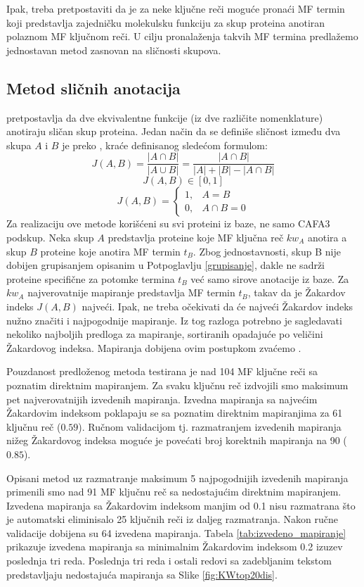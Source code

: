 Ipak, treba pretpostaviti da je za neke ključne reči moguće pronaći MF termin
koji predstavlja zajedničku molekulsku funkciju za skup proteina anotiran
polaznom MF ključnom reči.  U cilju pronalaženja takvih MF termina predlažemo
jednostavan metod zasnovan na sličnosti skupova.

\subsection{Metod sličnih anotacija}

 pretpostavlja da dve ekvivalentne funkcije (iz dve
različite nomenklature) anotiraju sličan skup proteina.  Jedan način da se
definiše sličnost između dva skupa $A$ i $B$ je preko 
, kraće   definisanog sledećom formulom:
$$J(A,B) = \dfrac{|A \cap B|}{|A \cup B|} =  \dfrac{|A \cap B|}{|A|+|B|-|A \cap B|}$$
$$  J(A,B) \in [0, 1] $$
\[   
  J(A,B) = 
    \begin{cases}
      1,&A=B  \\
      0,&A\cap B=0
    \end{cases}
\]
Za realizaciju ove metode korišćeni su svi proteini iz \swissprot baze, ne samo
CAFA3 podskup.  Neka skup $A$ predstavlja proteine koje MF ključna reč $kw_A$
anotira a skup $B$ proteine koje anotira MF termin $t_B$.  Zbog jednostavnosti,
skup B nije dobijen grupisanjem opisanim u Potpoglavlju \ref{grupisanje}, dakle ne sadrži proteine specifične za potomke termina $t_B$ već samo
sirove anotacije iz \swissprot baze.  Za $kw_A$ najverovatnije
mapiranje predstavlja MF termin $t_B$, takav da je Žakardov indeks $J(A,B)$
najveći. Ipak, ne treba očekivati da će najveći Žakardov indeks nužno značiti i
najpogodnije mapiranje. Iz tog razloga potrebno je  sagledavati nekoliko
najboljih predloga za mapiranje, sortiranih opadajuće po veličini Žakardovog
indeksa. Mapiranja dobijena ovim postupkom zvaćemo .

Pouzdanost predloženog metoda testirana je nad 104 MF ključne reči sa poznatim
direktnim mapiranjem.  Za svaku ključnu reč izdvojili smo maksimum pet
najverovatnijih izvedenih mapiranja. Izvedna mapiranja sa najvećim Žakardovim
indeksom poklapaju se sa poznatim direktnim mapiranjima za 61 ključnu reč
($0.59$). Ručnom validacijom tj. razmatranjem izvedenih mapiranja nižeg
Žakardovog indeksa moguće je povećati broj korektnih mapiranja na 90
($0.85$).

Opisani metod uz razmatranje maksimum 5 najpogodnijih izvedenih mapiranja
primenili smo nad 91 MF ključnu reč sa nedostajućim direktnim mapiranjem.
Izvedena mapiranja sa Žakardovim indeksom manjim od 0.1 nisu razmatrana što je
automatski eliminisalo 25 ključnih reči iz daljeg razmatranja. Nakon ručne
validacije dobijena su 64 izvedena mapiranja.  Tabela
\ref{tab:izvedeno_mapiranje} prikazuje izvedena mapiranja sa minimalnim
Žakardovim indeksom 0.2 izuzev poslednja tri reda. Poslednja tri reda i
ostali redovi sa zadebljanim tekstom  predstavljaju nedostajuća
mapiranja sa Slike \ref{fig:KWtop20dis}.


